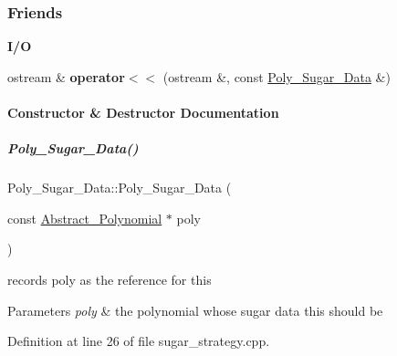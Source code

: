 \subsubsection*{Friends}
\begin{Indent}\textbf{ I/O}\par
\begin{DoxyCompactItemize}
\item 
\mbox{\label{group__strategygroup_ade466c9119513ef40b2b6220a98a72e6}} 
ostream \& {\bfseries operator$<$$<$} (ostream \&, const \hyperlink{group__strategygroup_class_poly___sugar___data}{Poly\+\_\+\+Sugar\+\_\+\+Data} \&)
\end{DoxyCompactItemize}
\end{Indent}


\paragraph{Constructor \& Destructor Documentation}
\mbox{\label{group__strategygroup_a0d9e2f66a44f2e10d26b977c55650f7f}} 
\subparagraph{\texorpdfstring{Poly\+\_\+\+Sugar\+\_\+\+Data()}{Poly\_Sugar\_Data()}}
{\footnotesize\ttfamily Poly\+\_\+\+Sugar\+\_\+\+Data\+::\+Poly\+\_\+\+Sugar\+\_\+\+Data (\begin{DoxyParamCaption}\item[{const \hyperlink{group__polygroup_class_abstract___polynomial}{Abstract\+\_\+\+Polynomial} $\ast$}]{poly }\end{DoxyParamCaption})\hspace{0.3cm}{\ttfamily [explicit]}}



records {\ttfamily poly} as the reference for {\ttfamily this} 


\begin{DoxyParams}{Parameters}
{\em poly} & the polynomial whose sugar data {\ttfamily this} should be \\
\hline
\end{DoxyParams}


Definition at line 26 of file sugar\+\_\+strategy.\+cpp.



